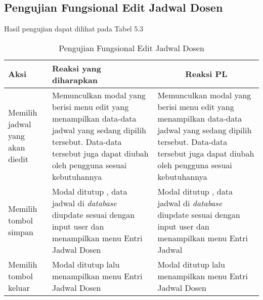 \subsection{Pengujian Fungsional Edit Jadwal Dosen}
Hasil pengujian dapat dilihat pada Tabel 5.3
\begin{center}
	\begin{table}[H]
		\begin{tabular}{|p{5cm}|p{5cm}|p{5cm}|}
		\hline
		\centering Aksi	& 	\centering Reaksi yang diharapkan &  \multicolumn{1}{c|}{Reaksi PL} \\
		\hline
		Memilih jadwal yang akan diedit & Memunculkan modal yang berisi menu edit yang menampilkan data-data jadwal yang sedang dipilih tersebut. Data-data tersebut juga dapat diubah oleh pengguna sesuai kebutuhannya & Memunculkan modal yang berisi menu edit yang menampilkan data-data jadwal yang sedang dipilih tersebut. Data-data tersebut juga dapat diubah oleh pengguna sesuai kebutuhannya \\
		\hline
		Memilih tombol simpan & Modal ditutup , data jadwal di \textit{database} diupdate sesuai dengan input user dan menampilkan menu Entri Jadwal Dosen & Modal ditutup , data jadwal di \textit{database} diupdate sesuai dengan input user dan menampilkan menu Entri Jadwal \\
		\hline
		Memilih tombol keluar & Modal ditutup lalu menampilkan menu Entri Jadwal Dosen & Modal ditutup lalu menampilkan menu Entri Jadwal Dosen \\
		\hline
		\end{tabular}
		\caption{Pengujian Fungsional Edit Jadwal Dosen}
	\end{table}
\end{center}

